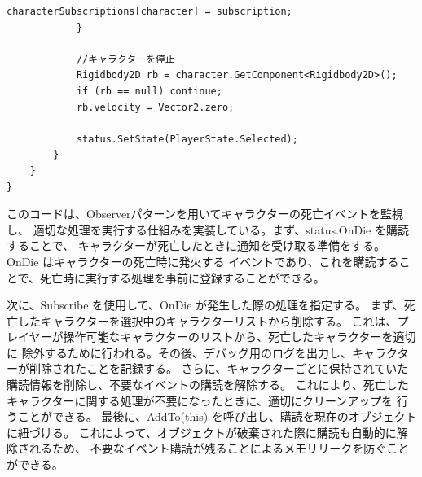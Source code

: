 \documentclass[dvipdfmx,fleqn,article]{jlreq}
\begin{document}
\begin{lstlisting}[language=CSharp, caption=PlayerCommandクラス, label={lst:PlayerCommand}]
                characterSubscriptions[character] = subscription;
            }

            //キャラクターを停止
            Rigidbody2D rb = character.GetComponent<Rigidbody2D>();
            if (rb == null) continue;
            rb.velocity = Vector2.zero;

            status.SetState(PlayerState.Selected);
        }
    }
}

\end{lstlisting}

このコードは、Observerパターンを用いてキャラクターの死亡イベントを監視し、
適切な処理を実行する仕組みを実装している。まず、status.OnDie を購読することで、
キャラクターが死亡したときに通知を受け取る準備をする。OnDie はキャラクターの死亡時に発火する
イベントであり、これを購読することで、死亡時に実行する処理を事前に登録することができる。

次に、Subscribe を使用して、OnDie が発生した際の処理を指定する。
まず、死亡したキャラクターを選択中のキャラクターリストから削除する。
これは、プレイヤーが操作可能なキャラクターのリストから、死亡したキャラクターを適切に
除外するために行われる。その後、デバッグ用のログを出力し、キャラクターが削除されたことを記録する。
さらに、キャラクターごとに保持されていた購読情報を削除し、不要なイベントの購読を解除する。
これにより、死亡したキャラクターに関する処理が不要になったときに、適切にクリーンアップを
行うことができる。
最後に、AddTo(this) を呼び出し、購読を現在のオブジェクトに紐づける。
これによって、オブジェクトが破棄された際に購読も自動的に解除されるため、
不要なイベント購読が残ることによるメモリリークを防ぐことができる。
\end{document}
